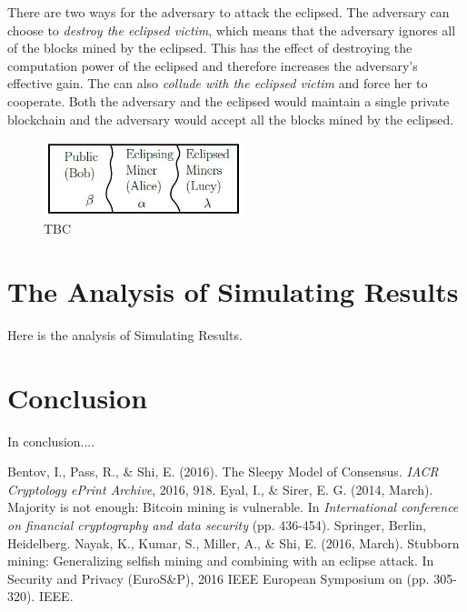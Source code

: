 \documentclass{llncs}
\begin{document}
There are two ways for the adversary to attack the eclipsed. The adversary can choose to \emph{destroy the eclipsed victim}, which means that the adversary ignores all of the blocks mined by the eclipsed. This has the effect of destroying the computation power of the eclipsed and therefore increases the adversary's effective gain. The can also \emph{collude with the eclipsed victim} and force her to cooperate. Both the adversary and the eclipsed would maintain a single private blockchain and the adversary would accept all the blocks mined by the eclipsed.

\vspace{-4mm}
\begin{figure}
\centering
\includegraphics[width=2.3in]{Figures/eclipsed.jpg}
\vspace{-3mm}
\caption{TBC}
\label{eclipsed}
\end{figure}
\section{The Analysis of Simulating Results}
Here is the analysis of Simulating Results.
\section{Conclusion}
In conclusion....


\begin{thebibliography}{}  %

Bentov, I., Pass, R., \& Shi, E. (2016). The Sleepy Model of Consensus. \emph{IACR Cryptology ePrint Archive}, 2016, 918.
Eyal, I., \& Sirer, E. G. (2014, March). Majority is not enough: Bitcoin mining is vulnerable. In \emph{International conference on financial cryptography and data security} (pp. 436-454). Springer, Berlin, Heidelberg.
Nayak, K., Kumar, S., Miller, A., \& Shi, E. (2016, March). Stubborn mining: Generalizing selfish mining and combining with an eclipse attack. In Security and Privacy (EuroS\&P), 2016 IEEE European Symposium on (pp. 305-320). IEEE.
\end{thebibliography}
%
\end{document}
